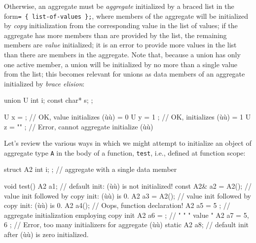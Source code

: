 \noindent Otherwise, an aggregate must be \emph{aggregate} initialized by a braced
list in the form\linebreak[4] 
\lstinline!=!~\lstinline!{!~\lstinline!list-of-values!~\lstinline!};!, where members
of the aggregate will be initialized by \emph{copy} initialization from
the corresponding value in the list of values; if the aggregate has more
members than are provided by the list, the remaining members are
\emph{value} initialized; it is an error to provide more values in the
list than there are members in the aggregate. Note that, because a union
has only one active member, a union will be initialized by no more than
a single value from the list; this becomes relevant for unions as data
members of an aggregate initialized by \emph{brace elision}:

\begin{emcppslisting}
union U
{
    int i;
    const char* s;
};

U x = {    };  // OK, value initializes (ù{}ù) = 0
U y = { 1  };  // OK, initializes (ù{}ù) = 1
U z = { "" };  // Error, cannot aggregate initialize (ù{}ù)
\end{emcppslisting}
    

\noindent Let's review the various ways in which we might attempt to initialize an
object of aggregate type \lstinline!A! in the body of a function,
\lstinline!test!, i.e., defined at function scope:

\begin{emcppslisting}
struct A2 { int i; };  // aggregate with a single data member

void test()
{
           A2  a1;             // default init: (ù{}ù) is not initialized!
    const  A2& a2 = A2();      // value init followed by copy init: (ù{}ù) is 0.
           A2  a3 = A2();      // value init followed by copy init: (ù{}ù) is 0.
           A2  a4();           // Oops, function declaration!
           A2  a5 = { 5 };     // aggregate initialization employing copy init
           A2  a6 = { };       //    "            "            "     value  "
           A2  a7 = { 5, 6 };  // Error, too many initializers for aggregate (ù{}ù)
    static A2  a8;             // default init after (ù{}ù) is zero initialized.
}
\end{emcppslisting}
    

